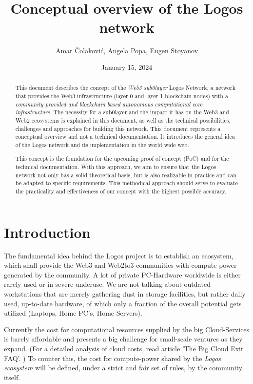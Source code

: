 \documentclass[]{article}
\title{Conceptual overview of the Logos network}
\author{Amar Čolaković, Angela Popa, Eugen Stoyanov}
\affil{LogosLabs}
\date{January 15, 2024}
\begin{document}
\maketitle

\begin{abstract}
This document describes the concept of the \textit{Web3 sub0layer} Logos Network, a network that provides the Web3 infrastructure (layer-0 and layer-1 blockchain nodes) with a \textit{community provided and blockchain based autonomous computational core infrastructure}.
The necessity for a sub0layer and the impact it has on the Web3 and Web2 ecosystems is explained in this document, as well as the technical possibilities, challenges and approaches for building this network.   
This document represents a conceptual overview and not a technical documentation. It introduces the general idea of the Logos network and its implementation in the world wide web.

This concept is the foundation for the upcoming proof of concept (PoC) and for the technical documentation. 
With this approach, we aim to ensure that the Logos network not only has a solid theoretical basis, but is also realizable in practice and can be adapted to specific requirements.
This methodical approach should serve to evaluate the practicality and effectiveness of our concept with the highest possible accuracy.    
\end{abstract}

\tableofcontents
\newpage

\section{Introduction}
The fundamental idea behind the Logos project is to establish an ecosystem, which shall provide the Web3 and Web2to3 communities with compute power generated by the community.
A lot of private PC-Hardware worldwide is either rarely used or in severe underuse. 
We are not talking about outdated workstations that are merely gathering dust in storage facilities, but rather daily used, up-to-date hardware, of which only a fraction of the overall potential gets utilized (Laptops, Home PC’s, Home Servers).

Currently the cost for computational resources supplied by the big Cloud-Services is barely affordable and presents a big challenge for small-scale ventures as they expand. (For a detailed analysis of cloud costs, read article 'The Big Cloud Exit FAQ'. \cite{david-hainemeier-hansson})
To counter this, the cost for compute-power shared by the \textit{Logos ecosystem} will be defined, under a strict and fair set of rules, by the community itself.
\end{document}
